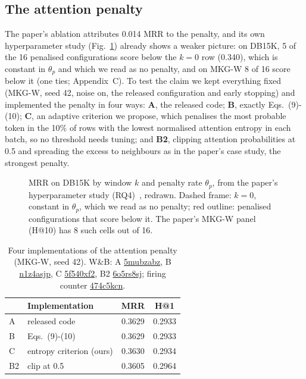\documentclass[conference,a4paper]{IEEEtran}
\newcommand{\wb}[2]{\href{https://wandb.ai/nhantrnh-graphml/#1}{{\normalfont\ttfamily #2}}}
\begin{document}
\subsection{The attention penalty}
\label{sec:c2}
The paper's ablation attributes 0.014 MRR to the penalty, and its own hyperparameter study
(Fig.~\ref{fig:heat}) already shows a weaker picture: on DB15K, 5 of the 16 penalised
configurations score below the $k=0$ row (0.340), which is constant in $\theta_p$ and
which we read as no penalty, and on MKG-W 8 of 16 score below it (one ties; Appendix~C). To test the claim we kept everything fixed
(MKG-W, seed 42, noise on, the released configuration and early stopping) and implemented
the penalty in four ways: \textbf{A}, the released code; \textbf{B}, exactly
Eqs.~(9)-(10); \textbf{C}, an adaptive criterion we propose, which penalises the most
probable token in the 10\% of rows with the lowest normalised attention entropy in each
batch, so no threshold needs tuning; and \textbf{B2}, clipping attention probabilities at
0.5 and spreading the excess to neighbours as in the paper's case study, the strongest
penalty.

\begin{figure}[!t]
\centering

\caption{MRR on DB15K by window $k$ and penalty rate $\theta_p$, from the paper's hyperparameter study (RQ4)~\cite{apkgc}, redrawn. Dashed frame: $k=0$, constant in $\theta_p$, which we read as no penalty; red outline: penalised configurations that score below it. The paper's MKG-W panel (H@10) has 8 such cells out of 16.}
\label{fig:heat}
\end{figure}

\begin{table}[!t]
\centering
\caption{Four implementations of the attention penalty (MKG-W, seed 42). W\&B: A \wb{apkgc-repro/runs/5mubzabz}{5mubzabz}, B \wb{apkgc-repro/runs/n1z4asjp}{n1z4asjp}, C \wb{apkgc-repro/runs/5f540xf2}{5f540xf2}, B2 \wb{apkgc-repro/runs/6o5rs8sj}{6o5rs8sj}; firing counter \wb{apkgc-repro/runs/474c5kcn}{474c5kcn}.}
\label{tab:penalty}
\small
\begin{tabular}{llcc}
\toprule
 & Implementation & MRR & H@1\\
\midrule
A & released code & 0.3629 & 0.2933\\
B & Eqs.\ (9)-(10) & 0.3629 & 0.2933\\
C & entropy criterion (ours) & 0.3630 & 0.2934\\
B2 & clip at 0.5 & 0.3605 & 0.2964\\
\bottomrule
\end{tabular}
\end{table}
\end{document}
